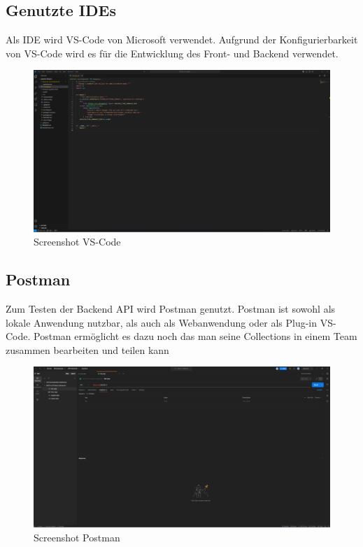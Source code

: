 \documentclass{article}
\begin{document}
    \subsection{Genutzte IDEs}
    Als IDE wird VS-Code von Microsoft verwendet. Aufgrund der Konfigurierbarkeit von VS-Code wird es für die Entwicklung des Front- und Backend verwendet.
    
    \begin{figure}[h]
        \centering
        \includegraphics[width= \textwidth]{images/VS-Code.png}
        \caption{Screenshot VS-Code}
        \label{fig:beispiel}
    \end{figure}
    \subsection{Postman}
    Zum Testen der Backend API wird Postman genutzt. Postman ist sowohl als lokale Anwendung nutzbar, als auch als Webanwendung oder als Plug-in VS-Code. Postman ermöglicht es dazu noch das man seine Collections in einem Team zusammen bearbeiten und teilen kann

    \begin{figure}[h]
        \centering
        \includegraphics[width= \textwidth]{images/Postman.png}
        \caption{Screenshot Postman}
        \label{fig:beispiel}
    \end{figure}
\end{document}
